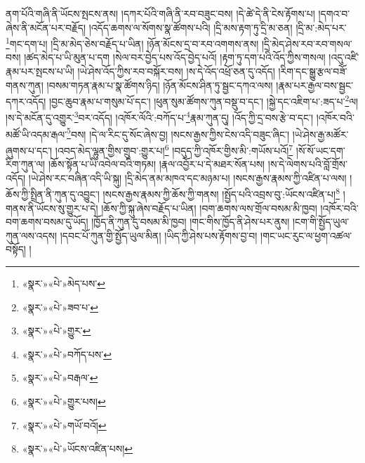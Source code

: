 ནག་པོའི་གཞི་ནི་ཡོངས་སྤངས་ནས། །དཀར་པོའི་གཞི་ནི་རབ་བཟུང་བས། །དེ་ཚེ་དེ་ནི་ངེས་རྟོགས་པ། །དགའ་བ་ཞེས་ནི་མངོན་པར་བརྗོད། །འདོད་ཆགས་ལ་སོགས་སྣ་ཚོགས་པའི། །དྲི་མས་རྟག་ཏུ་དྲི་མ་ཅན། །དྲི་མ་:མེད་པར་\footnote{«སྣར་»«པེ་»མེད་པས་}གང་དག་པ། །དྲི་མ་མེད་ཅེས་བརྗོད་པ་ཡིན། །ཉོན་མོངས་དྲ་བ་རབ་འགགས་ནས། །དྲི་མེད་ཤེས་རབ་རབ་གསལ་བས། །ཚད་མེད་པ་ཡི་མུན་པ་དག །སེལ་བར་བྱེད་པས་འོད་བྱེད་པའོ། །རྟག་ཏུ་དག་པའི་འོད་ཀྱིས་གསལ། །འདུ་འཛི་རྣམ་པར་སྤངས་པ་ཡི། །ཡེ་ཤེས་འོད་ཀྱིས་རབ་བསྐོར་བས། །ས་དེ་འོད་འཕྲོ་ཅན་དུ་འདོད། །རིག་དང་སྒྱུ་རྩལ་བཟོ་གནས་ཀུན། །བསམ་གཏན་རྣམ་པ་སྣ་ཚོགས་ཉིད། །ཉོན་མོངས་ཤིན་ཏུ་སྦྱང་དཀའ་ལས། །རྣམ་པར་རྒྱལ་བས་སྦྱང་དཀར་འདོད། །བྱང་ཆུབ་རྣམ་པ་གསུམ་པོ་དང་། །ཕུན་སུམ་ཚོགས་ཀུན་བསྡུ་བ་དང་། །སྐྱེ་དང་འཇིག་པ་:ཟད་པ་\footnote{«སྣར་»«པེ་»ཟབ་པ་}ལ། །ས་དེ་མངོན་དུ་འགྱུར་\footnote{«སྣར་»«པེ་»གྱུར་}བར་འདོད། །འཁོར་ལོའི་:བཀོད་པ་\footnote{«སྣར་»«པེ་»བཀོད་པས་}རྣམ་ཀུན་དུ། །འོད་ཀྱི་དྲ་བས་རྩེ་བ་དང་། །འཁོར་བའི་མཚོ་ཡི་འདམ་རྒལ་\footnote{«སྣར་»«པེ་»བརྒལ་}བས། །དེ་ལ་རིང་དུ་སོང་ཞེས་བྱ། །སངས་རྒྱས་ཀྱིས་ངེས་འདི་བཟུང་ཞིང་། །ཡེ་ཤེས་རྒྱ་མཚོར་ཞུགས་པ་དང་། །འབད་མེད་ལྷུན་གྱིས་གྲུབ་:གྱུར་པ།\footnote{«སྣར་»«པེ་»གྱུར་པས།} །བདུད་ཀྱི་འཁོར་གྱིས་མི་:གཡོས་པའོ།\footnote{«སྣར་»«པེ་»གཡོ་བའོ།} །སོ་སོ་ཡང་དག་རིག་ཀུན་ལ། །ཆོས་སྟོན་པ་ཡི་འབེལ་བའི་གཏམ། །རྣལ་འབྱོར་པ་དེ་མཐར་སོན་པས། །ས་དེ་ལེགས་པའི་བློ་གྲོས་འདོད། །ཡེ་ཤེས་རང་བཞིན་འདི་ཡི་སྐུ། །དྲི་མེད་ནམ་མཁའ་དང་མཉམ་པ། །སངས་རྒྱས་རྣམས་ཀྱི་འཛིན་པ་ལས། །ཆོས་ཀྱི་སྤྲིན་ནི་ཀུན་དུ་འབྱུང་། །སངས་རྒྱས་རྣམས་ཀྱི་ཆོས་ཀྱི་གནས། །སྤྱོད་པའི་འབྲས་བུ་:ཡོངས་འཛིན་པ།\footnote{«སྣར་»«པེ་»ཡོངས་འཛིན་པས།} །གནས་ནི་ཡོངས་སུ་གྱུར་པ་དེ། །ཆོས་ཀྱི་སྐུ་ཞེས་བརྗོད་པ་ཡིན། །བག་ཆགས་ལས་གྲོལ་བསམ་མི་ཁྱབ། །འཁོར་བའི་བག་ཆགས་བསམ་དུ་ཡོད། །ཁྱོད་ནི་ཀུན་དུ་བསམ་མི་ཁྱབ། །གང་གིས་ཁྱོད་ནི་ཤེས་པར་ནུས། །ངག་གི་སྤྱོད་ཡུལ་ཀུན་ལས་འདས། །དབང་པོ་ཀུན་གྱི་སྤྱོད་ཡུལ་མིན། །ཡིད་ཀྱི་ཤེས་པས་རྟོགས་བྱ་བ། །གང་ཡང་རུང་ལ་ཕྱག་འཚལ་བསྟོད། །
